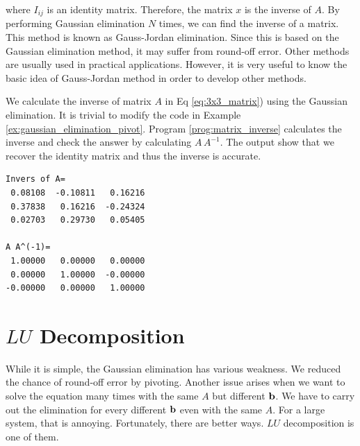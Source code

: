 where $I_{ij}$ is an identity matrix.  Therefore, the matrix $x$ is the inverse of $A$.  By performing Gaussian elimination $N$ times, we can find the inverse of a matrix.  This method is known as Gauss-Jordan elimination. Since this is based on the Gaussian elimination method, it may suffer from round-off error. Other methods are usually used in practical applications. However, it is very useful to know the basic idea of Gauss-Jordan method in order to develop other methods.

\bigskip
\begin{example}

We calculate the inverse of matrix $A$ in Eq \eqref{eq:3x3_matrix}) using the Gaussian elimination.
It is trivial to modify the code in Example \ref{ex:gaussian_elimination_pivot}.  Program \ref{prog:matrix_inverse} calculates the inverse and check the answer by calculating $A\, A^{-1}$. The output show that we recover the identity matrix and thus the inverse is accurate. 

\begin{mybox}

\small
\begin{verbatim}
Invers of A=
 0.08108  -0.10811   0.16216
 0.37838   0.16216  -0.24324
 0.02703   0.29730   0.05405

A A^(-1)=
 1.00000   0.00000   0.00000
 0.00000   1.00000  -0.00000
-0.00000   0.00000   1.00000
\end{verbatim}
\normalsize
\end{mybox}
\end{example}


\noindent
\section{$LU$ Decomposition}

While it is simple, the Gaussian elimination has various weakness.  We reduced the chance of round-off error by pivoting.  Another issue arises when we want to solve the equation many times with the same $A$ but different $\vb{b}$.  We have to carry out the elimination for every different $\vb{b}$ even with the same $A$.  For a large system, that is annoying.  Fortunately, there are better ways.  $LU$ decomposition\cite{matrix_comp} is one of them.

